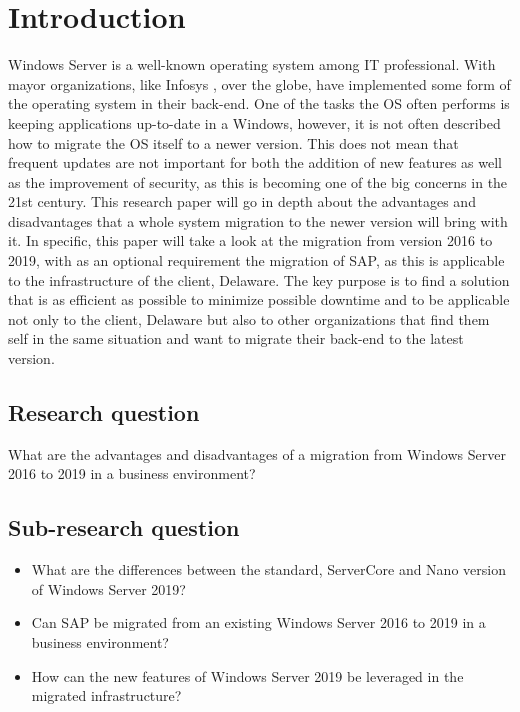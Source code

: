 \section{Introduction}\label{sec:introduction}
Windows Server is a well-known operating system among IT professional. With mayor organizations, like Infosys \autocite{S.Chauhan2015}, over the globe, have implemented some form of the operating system in their back-end. One of the tasks the OS often performs is keeping applications up-to-date in a Windows, however, it is not often described how to migrate the OS itself to a newer version. 
This does not mean that frequent updates are not important for both the addition of new features as well as the improvement of security, as this is becoming one of the big concerns in the 21st century. 
This research paper will go in depth about the advantages and disadvantages that a whole system migration to the newer version will bring with it. In specific, this paper will take a look at the migration from version 2016 to 2019, with as an optional requirement the migration of SAP, as this is applicable to the infrastructure of the client, Delaware.
The key purpose is to find a solution that is as efficient as possible to minimize possible downtime and to be applicable not only to the client, Delaware but also to other organizations that find them self in the same situation and want to migrate their back-end to the latest version.
\subsection{Research question}
What are the advantages and disadvantages of a migration from Windows Server 2016 to 2019 in a business environment?
\subsection{Sub-research question}
\begin{itemize}
	\item What are the differences between the standard, ServerCore and Nano version of Windows Server 2019?
	\item Can SAP be migrated from an existing Windows Server 2016 to 2019 in a business environment?
	\item How can the new features of Windows Server 2019 be leveraged in the migrated infrastructure? 
\end{itemize}
